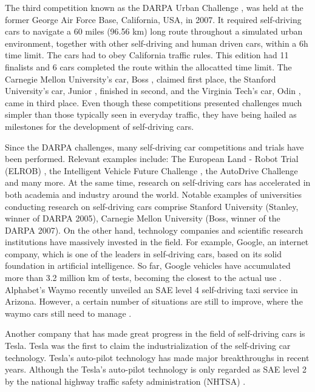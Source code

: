 The third competition known as the DARPA Urban Challenge \cite{10.5555/1822544}, was held at the former George Air Force Base, California, USA, in 2007. It required self-driving cars to navigate a 60 miles (96.56 km) long route throughout a simulated urban environment, together with other self-driving and human driven cars, within a 6h time limit. The cars had to obey California traffic rules. This edition had 11 finalists and 6 cars completed the route within the allocatted time limit. The Carnegie Mellon University's car, Boss \cite{BOSS}, claimed first place, the Stanford University's car, Junior \cite{Junior}, finished in second, and the Virginia Tech's car, Odin \cite{Odin}, came in third place. Even though these competitions presented challenges much simpler than those typically seen in everyday traffic, they have being hailed as milestones for the development of self-driving cars.

Since the DARPA challenges, many self-driving car competitions and trials have been performed. Relevant examples include: The European Land - Robot Trial (ELROB) \cite{ELROB}, the Intelligent Vehicle Future Challenge \cite{wang2021china}, the AutoDrive Challenge \cite{AutoDrive} and many more. At the same time, research on self-driving cars has accelerated in both academia and industry around the world. Notable examples of universities conducting research on self-driving cars comprise Stanford University (Stanley, winner of DARPA 2005), Carnegie Mellon University (Boss, winner of the DARPA 2007). On the other hand, technology companies and scientific research institutions have massively invested in the field. For example, Google, an internet company, which is one of the leaders in self-driving cars, based on its solid foundation in artificial intelligence. So far, Google vehicles have accumulated more than 3.2 million km of tests, becoming the closest to the actual use \cite{Waymo1}. Alphabet's Waymo recently unveiled an SAE level 4 self-driving taxi service in Arizona. However, a certain number of situations are still to improve, where the waymo cars still need to manage \cite{waymo2}. 

Another company that has made great progress in the field of self-driving cars is Tesla. Tesla was the first to claim the industrialization of the self-driving car technology. Tesla's auto-pilot technology has made major breakthroughs in recent years. Although the Tesla's auto-pilot technology is only regarded as SAE level 2 by the national highway traffic safety administration (NHTSA) \cite{waymo2}. 

